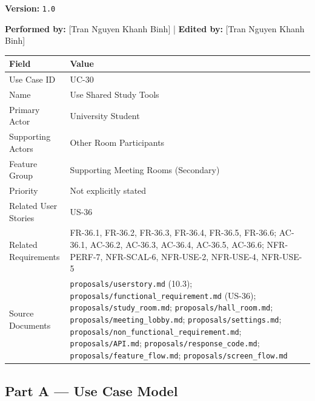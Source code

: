 \documentclass[12pt]{article}
\renewcommand{\baselinestretch}{1.5}
\begin{document}
\textbf{Version:} \texttt{1.0}
\par\medskip

\textbf{Performed by:} [Tran Nguyen Khanh Binh] | \textbf{Edited by:} [Tran Nguyen Khanh Binh]
\par\medskip

\begingroup
\small
\renewcommand{\baselinestretch}{1.0}\selectfont
\renewcommand{\arraystretch}{1.15}
\setlength{\tabcolsep}{6pt}
\begin{longtable}{|>{\raggedright\arraybackslash}p{}|>{\raggedright\arraybackslash}p{}|}
\hline
\textbf{Field} & \textbf{Value} \\ \hline
\endhead
Use Case ID & UC-30 \\ \hline
Name & Use Shared Study Tools \\ \hline
Primary Actor & University Student \\ \hline
Supporting Actors & Other Room Participants \\ \hline
Feature Group & Supporting Meeting Rooms (Secondary) \\ \hline
Priority & Not explicitly stated \\ \hline
Related User Stories & US-36 \\ \hline
Related Requirements & FR-36.1, FR-36.2, FR-36.3, FR-36.4, FR-36.5, FR-36.6; AC-36.1, AC-36.2, AC-36.3, AC-36.4, AC-36.5, AC-36.6; NFR-PERF-7, NFR-SCAL-6, NFR-USE-2, NFR-USE-4, NFR-USE-5 \\ \hline
Source Documents & \texttt{proposals/userstory.md} (10.3); \texttt{proposals/functional\_requirement.md} (US-36); \texttt{proposals/study\_room.md}; \texttt{proposals/hall\_room.md}; \texttt{proposals/meeting\_lobby.md}; \texttt{proposals/settings.md}; \texttt{proposals/non\_functional\_requirement.md}; \texttt{proposals/API.md}; \texttt{proposals/response\_code.md}; \texttt{proposals/feature\_flow.md}; \texttt{proposals/screen\_flow.md} \\ \hline
\end{longtable}
\endgroup
\par\medskip

\hypertarget{sec:part-a-use-case-model}{}
\subsection*{Part A --- Use Case Model}
\par\medskip

\hypertarget{sec:a1-focused-use-case-diagram}{}
\end{document}

